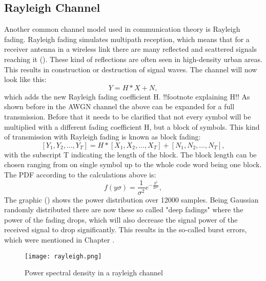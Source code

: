 \subsection{Rayleigh Channel}
\label{sec:rayleigh}
Another common channel model used in communication theory is Rayleigh fading. Rayleigh fading simulates multipath reception, which means that for a receiver antenna in a wireless link there are many reflected and scattered signals reaching it (). These kind of reflections are often seen in high-density urban areas. This results in construction or destruction of signal waves. The channel will now look like this:
\begin{equation}
\label{eq:rayleigh1}
Y = H * X + N,  
\end{equation}
which adds the new Rayleigh fading coefficient H. !!footnote explaining H!!
\newline
As shown before in the \gls{AWGN} channel the above  can be expanded for a full transmission. Before that it needs to be clarified that not every symbol will be multiplied with a different fading coefficient H, but a block of symbols. This kind of transmission with Rayleigh fading is known as block fading:
\begin{equation}
\label{eq:rayleigh2}
[Y_1,Y_2,...,Y_T] = H * [X_1,X_2,...,X_T] + [N_1,N_2,...,N_T],  
\end{equation}
with the subscript T indicating the length of the block. The block length can be chosen ranging from on single symbol up to the whole code word being one block. 
The PDF according to the calculations above is:
\begin{equation}
\label{eq:raypdf}
f(y\sigma) = \frac{1}{\sigma^2}e^{-\frac{y^2}{2\sigma^2}},
\end{equation}
\newline
The graphic () shows the power distribution over 12000 samples. Being Gaussian randomly distributed there are now these so called "deep fadings" where the power of the fading drops, which will also decrease the signal power of the received signal to drop significantly. This results in the so-called burst errors, which were mentioned in Chapter .


\begin{figure}[!htb]
	\centering
	\texttt{[image: rayleigh.png]}
	\caption{Power spectral density in a rayleigh channel}
	\label{fig:rayleigh}
\end{figure}